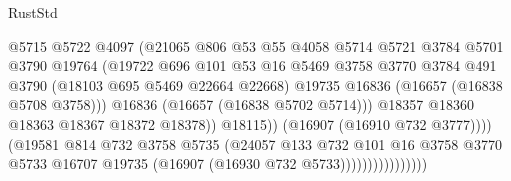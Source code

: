\begin{lexlean}{RustStd}
\begin{coremodule}
                                        @5715
                                        @5722
                                        @4097
                                        (@21065
                                          @806
                                          @53
                                          @55
                                          @4058
                                          @5714
                                          @5721
                                          @3784
                                          @5701
                                          @3790
                                          @19764
                                          (@19722
                                            @696
                                            @101
                                            @53
                                            @16
                                            @5469
                                            @3758
                                            @3770
                                            @3784
                                            @491
                                            @3790
                                            (@18103 @695 @5469 @22664 @22668)
                                            @19735
                                            @16836
                                            (@16657 (@16838 @5708 @3758)))
                                          @16836
                                          (@16657 (@16838 @5702 @5714)))
                                        @18357
                                        @18360
                                        @18363
                                        @18367
                                        @18372
                                        @18378))
                                    @18115))
                                (@16907 (@16910 @732 @3777))))
                            (@19581
                              @814
                              @732
                              @3758
                              @5735
                              (@24057
                                @133
                                @732
                                @101
                                @16
                                @3758
                                @3770
                                @5733
                                @16707
                                @19735
                                (@16907 (@16930 @732 @5733))))))))))))))))

\end{coremodule}
\end{lexlean}
